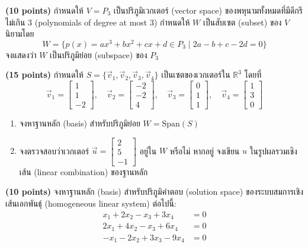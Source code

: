 ﻿\documentclass[12pt, a4paper]{exam}
\begin{document}
\begin{questions}
\setcounter{question}{0}

\question \textbf{(10 points)} กำหนดให้ $V = P_3$ เป็นปริภูมิเวกเตอร์ (vector space) ของพหุนามทั้งหมดที่มีดีกรีไม่เกิน 3 (polynomials of degree at most 3) กำหนดให้ $W$ เป็นสับเซต (subset) ของ $V$ นิยามโดย
\[
W = \{p(x) = ax^3 + bx^2 + cx + d \in P_3 \mid 2a - b + c - 2d = 0\}
\]
จงแสดงว่า $W$ เป็นปริภูมิย่อย (subspace) ของ $P_3$

\question \textbf{(15 points)} กำหนดให้ $S = \{\vec{v}_1, \vec{v}_2, \vec{v}_3, \vec{v}_4\}$ เป็นเซตของเวกเตอร์ใน $\mathbb{R}^3$ โดยที่
\[
\vec{v}_1 = \begin{bmatrix} 1 \\ 1 \\ -2 \end{bmatrix}, \quad
\vec{v}_2 = \begin{bmatrix} -2 \\ -2 \\ 4 \end{bmatrix}, \quad
\vec{v}_3 = \begin{bmatrix} 0 \\ 1 \\ 1 \end{bmatrix}, \quad
\vec{v}_4 = \begin{bmatrix} 1 \\ 3 \\ 0 \end{bmatrix}
\]
\begin{enumerate}[label=(\alph*)]
    \item จงหาฐานหลัก (basis) สำหรับปริภูมิย่อย $W = \text{Span}(S)$
    \item จงตรวจสอบว่าเวกเตอร์ $\vec{u} = \begin{bmatrix} 2 \\ 5 \\ -1 \end{bmatrix}$ อยู่ใน $W$ \mbox{หรือไม่} หากอยู่ จงเขียน $u$ ในรูปผลรวมเชิงเส้น (linear combination) ของฐานหลัก
\end{enumerate}
\newpage

\question \textbf{(10 points)} จงหาฐานหลัก (basis) สำหรับปริภูมิคำตอบ (solution space) ของระบบสมการเชิงเส้นเอกพันธุ์ (homogeneous linear system) ต่อไปนี้:
\[
\begin{aligned}
x_1 + 2x_2 - x_3 + 3x_4 &= 0 \\
2x_1 + 4x_2 - x_3 + 6x_4 &= 0 \\
-x_1 - 2x_2 + 3x_3 - 9x_4 &= 0
\end{aligned}
\]


\end{questions}
\end{document}
